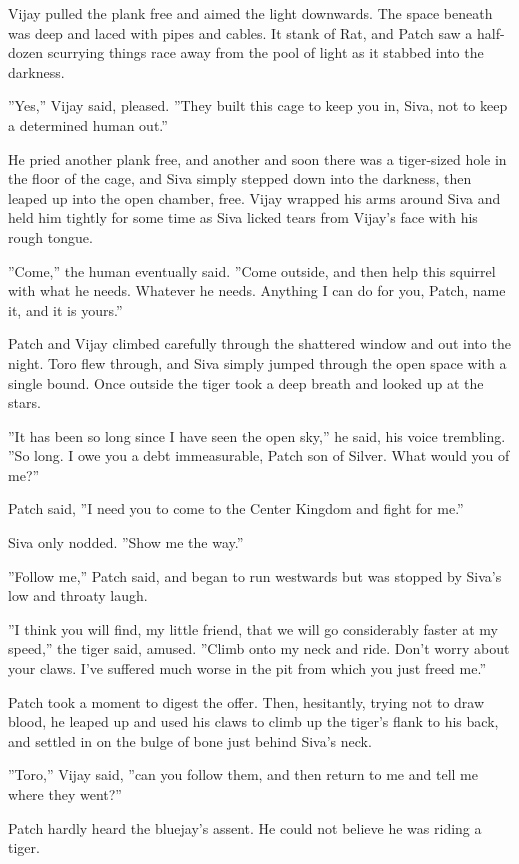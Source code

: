\documentclass[12pt]{book}
\begin{document}
Vijay pulled the plank free and aimed the light downwards. The space beneath was deep and laced with pipes and cables. It stank of Rat, and Patch saw a half-dozen scurrying things race away from the pool of light as it stabbed into the darkness.

''Yes,'' Vijay said, pleased. ''They built this cage to keep you in, Siva, not to keep a determined human out.''

He pried another plank free, and another %
and soon there was a tiger-sized hole in the floor of the cage, and Siva simply stepped down into the darkness, then leaped up into the open chamber, free. Vijay wrapped his arms around Siva and held him tightly for some time as Siva licked tears from Vijay's face with his rough tongue.

''Come,'' the human eventually said. ''Come outside, and then help this squirrel with what he needs. Whatever he needs. Anything I can do for you, Patch, name it, and it is yours.''

Patch and Vijay climbed carefully through the shattered window and out into the night. Toro flew through, and Siva simply jumped through the open space with a single bound. Once outside the tiger took a deep breath and looked up at the stars.

''It has been so long since I have seen the open sky,'' he said, his voice trembling. ''So long. I owe you a debt immeasurable, Patch son of Silver. What would you of me?''

Patch said, ''I need you to come to the Center Kingdom and fight for me.''

Siva only nodded. ''Show me the way.''

''Follow me,'' Patch said, and began to run westwards %
but was stopped by Siva's low and throaty laugh.

''I think you will find, my little friend, that we will go considerably faster at my speed,'' the tiger said, amused. ''Climb onto my neck and ride. Don't worry about your claws. I've suffered much worse in the pit from which you just freed me.''

Patch took a moment to digest the offer. Then, hesitantly, trying not to draw blood, he leaped up and used his claws to climb up the tiger's flank to his back, and settled in on the bulge of bone just behind Siva's neck.

''Toro,'' Vijay said, ''can you follow them, and then return to me and tell me where they went?''

Patch hardly heard the bluejay's assent. He could not believe he was riding a tiger.
\end{document}
